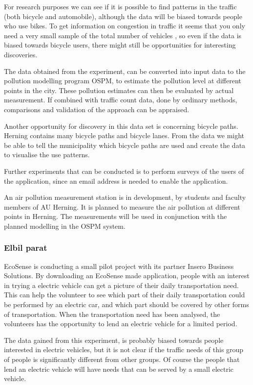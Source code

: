 For research purposes we can see if it is possible to find patterns in the traffic (both bicycle and automobile), although the data will be biased towards people who use bikes. To get information on congestion in traffic it seems that you only need a very small sample of the total number of vehicles \cite{Herrera2010}, so even if the data is biased towards bicycle users, there might still be opportunities for interesting discoveries.

The data obtained from the experiment, can be converted into input data to the pollution modelling program OSPM, to estimate the pollution level at different points in the city. These pollution estimates can then be evaluated by actual measurement. If combined with traffic count data, done by ordinary methods, comparisons and validation of the approach can be appraised.

Another opportunity for discovery in this data set is concerning bicycle paths. Herning contains many bicycle paths and bicycle lanes. From the data we might be able to tell the municipality which bicycle paths are used and create the data to visualise the use patterns.

Further experiments that can be conducted is to perform surveys of the users of the application, since an email address is needed to enable the application.

An air pollution measurement station is in development, by students and faculty members of AU Herning. It is planned to measure the air pollution at different points in Herning. The measurements will be used in conjunction with the planned modelling in the OSPM system.

\subsubsection{Elbil parat}

EcoSense is conducting a small pilot project with its partner Insero Business Solutions. By downloading an EcoSense made application, people with an interest in trying a electric vehicle can get a picture of their daily transportation need. This can help the volunteer to see which part of their daily transportation could be performed by an electric car, and which part should be covered by other forms of transportation. When the transportation need has been analysed, the volunteers has the opportunity to lend an electric vehicle for a limited period.

The data gained from this experiment, is probably biased towards people interested in electric vehicles, but it is not clear if the traffic needs of this group of people is significantly different from other groups. Of course the people that lend an electric vehicle will have needs that can be served by a small electric vehicle.


